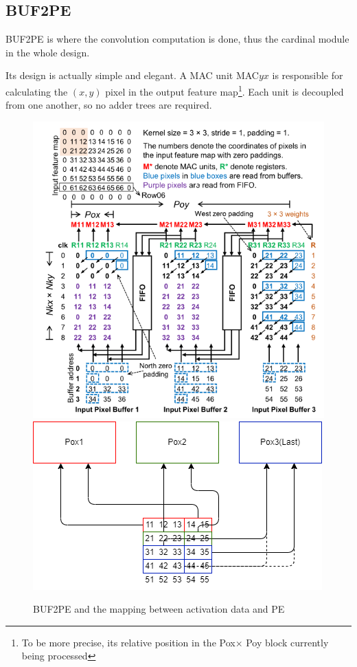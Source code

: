 \subsection{BUF2PE}\label{BUF2PE}

BUF2PE is where the convolution computation is done, thus the cardinal module in the whole design. 

Its design is actually simple and elegant. A MAC unit MAC$yx$ is responsible for calculating the $(x, y)$ pixel in the output feature map\footnote{To be more precise, its relative position in the Pox$\times$ Poy block currently being processed}. Each unit is decoupled from one another, so no adder trees are required. 

\begin{figure}
    \centering
    \includegraphics[width=0.8\columnwidth]{figures/BUF2PE.png}
    \includegraphics[width=0.8\columnwidth]{figures/act.png}
    \caption{BUF2PE and the mapping between activation data and PE}
\end{figure}

